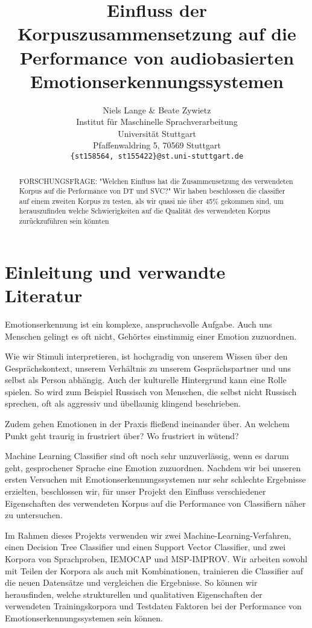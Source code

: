 \documentclass{article} %
\title{Einfluss der Korpuszusammensetzung auf die Performance von audiobasierten Emotionserkennungssystemen}
\author{Niels Lange \& Beate Zywietz\\
Institut für Maschinelle Sprachverarbeitung\\
Universität Stuttgart\\
Pfaffenwaldring 5, 70569 Stuttgart \\
\texttt{\{st158564, st155422\}@st.uni-stuttgart.de} \\
}
\begin{document}
\maketitle
\begin{abstract}

FORSCHUNGSFRAGE: "Welchen Einfluss hat die Zusammensetzung des verwendeten Korpus auf die Performance von DT und SVC?"
Wir haben beschlossen die classifier auf einem zweiten Korpus zu testen, als wir quasi nie über 45\% gekommen sind, um herauszufinden welche Schwierigkeiten auf die Qualität des verwendeten Korpus zurückzuführen sein könnten
\end{abstract}

\section{Einleitung und verwandte Literatur}

Emotionserkennung ist ein komplexe, anspruchsvolle Aufgabe. Auch uns Menschen gelingt es oft nicht, Gehörtes einstimmig einer Emotion zuzuordnen. 

Wie wir Stimuli interpretieren, ist hochgradig von unserem Wissen über den Gesprächskontext, unserem Verhältnis zu unserem Gesprächspartner und uns selbst als Person abhängig. Auch der kulturelle Hintergrund kann eine Rolle spielen. So wird zum Beispiel Russisch von Menschen, die selbst nicht Russisch sprechen, oft als aggressiv und übellaunig klingend beschrieben. 

Zudem gehen Emotionen in der Praxis fließend ineinander über. An welchem Punkt geht traurig in frustriert über? Wo frustriert in wütend? 

Machine Learning Classifier sind oft noch sehr unzuverlässig, wenn es darum geht, gesprochener Sprache eine Emotion zuzuordnen. Nachdem wir bei unseren ersten Versuchen mit Emotionserkennungssystemen nur sehr schlechte Ergebnisse erzielten, beschlossen wir, für unser Projekt den Einfluss verschiedener Eigenschaften des verwendeten Korpus auf die Performance von Classifiern näher zu untersuchen. 

Im Rahmen dieses Projekts verwenden wir zwei Machine-Learning-Verfahren, einen Decision Tree Classifier und einen Support Vector Classifier, und zwei Korpora von Sprachproben, IEMOCAP und MSP-IMPROV. Wir arbeiten sowohl mit Teilen der Korpora als auch mit Kombinationen, trainieren die Classifier auf die neuen Datensätze und vergleichen die Ergebnisse. So können wir herausfinden, welche strukturellen und qualitativen Eigenschaften der verwendeten Trainingskorpora und Testdaten Faktoren bei der Performance von Emotionserkennungssystemen sein können. 
\end{document}
